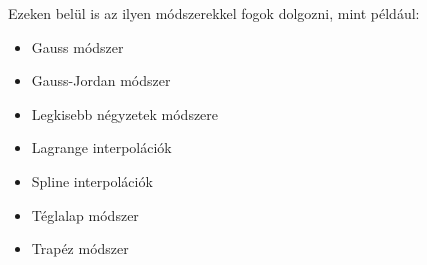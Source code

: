 Ezeken belül is az ilyen módszerekkel fogok dolgozni, mint például:

\begin{itemize}
\item
  Gauss módszer
\item
  Gauss-Jordan módszer
\item
  Legkisebb négyzetek módszere
\item
  Lagrange interpolációk
\item
  Spline interpolációk
\item
  Téglalap módszer
\item
  Trapéz módszer
\end{itemize}


